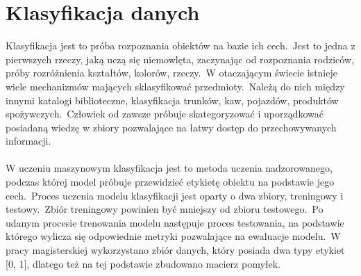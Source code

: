 \chapter{Klasyfikacja danych}

Klasyfikacja jest to próba rozpoznania obiektów na bazie ich cech.\ Jest to jedna z pierwszych rzeczy, jaką uczą się niemowlęta, zaczynając od rozpoznania rodziców, próby rozróżnienia kształtów, kolorów, rzeczy.\ W otaczającym świecie istnieje wiele mechanizmów mających sklasyfikować przedmioty.\ Należą do nich między innymi katalogi biblioteczne, klasyfikacja trunków, kaw, pojazdów, produktów spożywczych.\ Człowiek od zawsze próbuje skategoryzować i uporządkować posiadaną wiedzę w zbiory pozwalające na łatwy dostęp do przechowywanych informacji.
\\ \\
W uczeniu maszynowym klasyfikacja jest to metoda uczenia nadzorowanego, podczas której model próbuje przewidzieć etykietę obiektu na podstawie jego cech.\ Proces uczenia modelu klasyfikacji jest oparty o dwa zbiory, treningowy i testowy.\ Zbiór treningowy powinien być mniejszy od zbioru testowego.\ Po udanym procesie trenowania modelu następuje proces testowania, na podstawie którego wylicza się odpowiednie metryki pozwalające na ewaluacje modelu.\ W pracy magisterskiej wykorzystano zbiór danych, który posiada dwa typy etykiet [0, 1], dlatego też na tej podstawie zbudowano macierz pomyłek.

\vfill
\pagebreak


